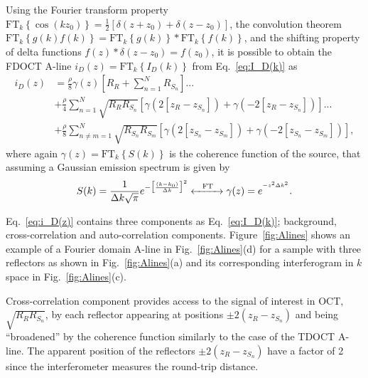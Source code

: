 Using the Fourier transform property $\text{FT}_k\left\{\cos(kz_0)\right\} = \frac{1}{2}\left[\delta\left(z+z_0\right) + \delta\left(z-z_0\right)\right]$, the convolution theorem $\text{FT}_k\left\{g\left(k\right)f\left(k\right)\right\} = \text{FT}_k\left\{g\left(k\right)\right\} \ast \text{FT}_k\left\{f\left(k\right)\right\}$, and the shifting property of delta functions $f(z)*\delta\left(z-z_0\right) = f(z_0)$, it is possible to obtain the FDOCT A-line $i_D(z) = \text{FT}_k\left\{I_D(k)\right\}$ from Eq.~\ref{eq:I_D(k)} as~\cite{Izatt2015_Theory}
\begin{align}\label{eq:i_D(z)}
    i_D(z) &= \frac{\rho}{8}\gamma\left(z\right)\left[R_R + \sum_{n=1}^NR_{S_n}\right] ... \nonumber\\
    &+ \frac{\rho}{4}\sum_{n=1}^N \sqrt{R_RR_{S_n}} \left[\gamma\left(2\left[z_R-z_{S_n}\right]\right) + \gamma\left(-2\left[z_R-z_{S_n}\right]\right)\right]...\\
    &+ \frac{\rho}{8}\sum_{n\neq m=1}^N \sqrt{R_{S_n}R_{S_m}} \left[\gamma\left(2\left[z_{S_n}-z_{S_m}\right]\right) + \gamma\left(-2\left[z_{S_n}-z_{S_m}\right]\right)\right], \nonumber
\end{align}
where again $\gamma\left(z\right)=\text{FT}_k\left\{S(k)\right\}$ is the coherence function of the source, that assuming a Gaussian emission spectrum is given by
\begin{align} \label{eq:SGamma}
    S(k) =\frac{1}{\Delta k\sqrt{\pi}}e^{-\big[\frac{(k-k_0)}{\Delta k}\big]^2} \xleftrightarrow{\hspace{8 pt}\text{FT}\hspace{8 pt}} \gamma(z) = e^{^{-z^2\Delta k^2}}.
\end{align}

Eq.~\eqref{eq:i_D(z)} contains three components as Eq.~\eqref{eq:I_D(k)}; background, cross-correlation and auto-correlation components. Figure~\ref{fig:Alines} shows an example of a Fourier domain A-line in Fig.~\ref{fig:Alines}(d) for a sample with three reflectors as shown in Fig.~\ref{fig:Alines}(a) and its corresponding interferogram in $k$ space in Fig.~\ref{fig:Alines}(c).

Cross-correlation component provides access to the signal of interest in OCT, $\sqrt{R_RR_{S_n}}$, by each reflector appearing at positions $\pm2(z_R-z_{S_n})$ and being ``broadened'' by the coherence function similarly to the case of the TDOCT A-line. The apparent position of the reflectors $\pm2(z_R-z_{S_n})$ have a factor of 2 since the interferometer measures the round-trip distance.

